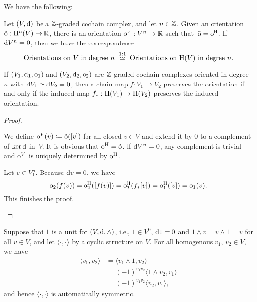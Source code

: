 \documentclass[\MainFolder/Text.tex]{subfiles}
\begin{document}
\begin{Proposition}\label{Prop:OrOnHomG}
We have the following:
\begin{ClaimList}
\item Let $(V,\mathrm{d})$ be a $\mathbb{Z}$-graded cochain complex, and let $n\in \mathbb{Z}$. Given an orientation $\tilde{\mathrm{o}}: \mathrm{H}^n(V) \rightarrow \mathbb{R}$, there is an orientation $\mathrm{o}^V: V^n \rightarrow \mathbb{R}$ such that~$\tilde{\mathrm{o}} = \mathrm{o}^{\mathrm{H}}$. If $\mathrm{d} V^n = 0$, then we have the correspondence
$$\text{Orientations on }V\text{ in degree }n\ \overset{1:1}{\simeq}\ \text{Orientations on }\H(V)\text{ in degree }n. $$  
\item If $(V_1,\mathrm{d}_1,\mathrm{o}_1)$ and $(V_2,\mathrm{d}_2,\mathrm{o}_2)$ are $\mathbb{Z}$-graded cochain complexes oriented in degree $n$ with $\mathrm{d} V_1 \simeq \mathrm{d} V_2 = 0$, then a chain map $f: V_1 \rightarrow V_2$ preserves the orientation if and only if the induced map $f_*: \mathrm{H}(V_1) \rightarrow \mathrm{H}(V_2)$ preserves the induced orientation.
\end{ClaimList}
\end{Proposition}
\begin{proof}
\begin{ProofList}
\item We define $\mathrm{o}^V(v) \coloneqq \tilde{\mathrm{o}}([v])$ for all closed $v\in V$ and extend it by $0$ to a complement of $\operatorname{ker} \mathrm{d}$ in~$V$. It is obvious that $\mathrm{o}^{\mathrm{H}} = \tilde{\mathrm{o}}$. If $\mathrm{d} V^n = 0$, any complement is trivial and $\mathrm{o}^V$ is uniquely determined by $\mathrm{o}^{\mathrm{H}}$.

\item Let $v\in V_1^n$. Because $\mathrm{d} v = 0$, we have
$$ \mathrm{o}_2(f(v)) = \mathrm{o}^{\mathrm{H}}_2([f(v)]) = \mathrm{o}^{\mathrm{H}}_2(f_*[v]) = \mathrm{o}^{\mathrm{H}}_1([v]) = \mathrm{o}_1(v). $$
This finishes the proof.\qedhere
\end{ProofList}
\end{proof}

Suppose that $1$ is a unit for $(V,\mathrm{d},\wedge)$, i.e., $1\in V^0$, $\mathrm{d} 1 = 0$ and $1\wedge v = v \wedge 1 = v$ for all $v\in V$, and let $\langle \cdot,\cdot\rangle$ by a cyclic structure on $V$. For all homogenous $v_1$, $v_2\in V$, we have 
\begin{align*}
\langle v_1, v_2 \rangle &= \langle v_1\wedge 1,v_2\rangle \\
& = (-1)^{v_1 v_2}\langle 1\wedge v_2, v_1 \rangle \\
& = (-1)^{v_1 v_2}\langle v_2, v_1 \rangle,  
\end{align*}
and hence $\langle \cdot,\cdot\rangle$ is automatically symmetric.
\end{document}
